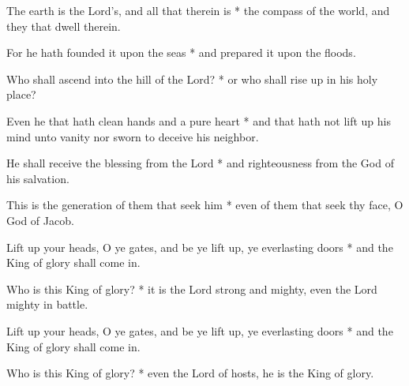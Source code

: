The earth is the Lord's, and all that therein is * the compass of the world, and they that dwell therein.

For he hath founded it upon the seas * and prepared it upon the floods.

Who shall ascend into the hill of the Lord? * or who shall rise up in his holy place?

Even he that hath clean hands and a pure heart * and that hath not lift up his mind unto vanity nor sworn to deceive his neighbor.

He shall receive the blessing from the Lord * and righteousness from the God of his salvation.

This is the generation of them that seek him * even of them that seek thy face, O God of Jacob.

Lift up your heads, O ye gates, and be ye lift up, ye everlasting doors * and the King of glory shall come in.

Who is this King of glory? * it is the Lord strong and mighty, even the Lord mighty in battle.

Lift up your heads, O ye gates, and be ye lift up, ye everlasting doors * and the King of glory shall come in.

Who is this King of glory? * even the Lord of hosts, he is the King of glory.
